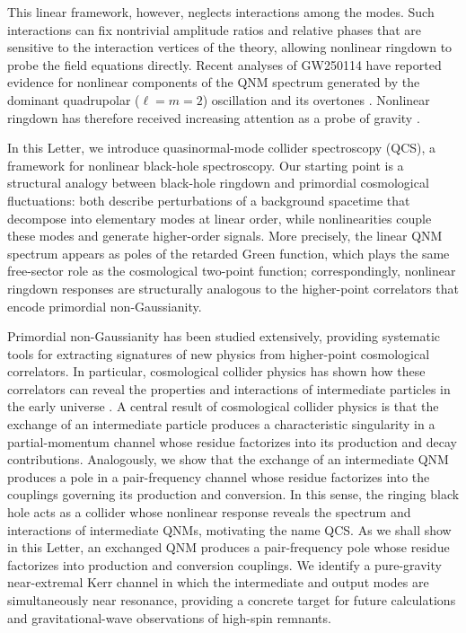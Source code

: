 \documentclass[
 reprint,
 amsmath,amssymb,
 aps,
 prl,
 superscriptaddress,
 nofootinbib
]{revtex4-2}
\begin{document}
This linear framework, however, neglects interactions among the modes. Such interactions can fix nontrivial amplitude ratios and relative phases that are sensitive to the interaction vertices of the theory, allowing nonlinear ringdown to probe the field equations directly. Recent analyses of GW250114
have reported evidence for nonlinear components of the QNM spectrum generated by the dominant quadrupolar ($\ell=m=2$) oscillation and its overtones \cite{LVKGW250114,YangShiHu2025,WangEtAl2026}. Nonlinear ringdown has therefore received increasing attention as a probe of gravity \cite{MitmanEtAl2023,CheungEtAl2024,BucciottiEtAl2024PRD,BucciottiEtAl2024JHEP,MaYang2024,KheraMaYang2025,BourgEtAl2025}.

In this Letter, we introduce quasinormal-mode collider spectroscopy (QCS), a framework for nonlinear black-hole spectroscopy. Our starting point is a structural analogy between black-hole ringdown and primordial cosmological fluctuations: both describe perturbations of a background spacetime that decompose into elementary modes at linear order, while nonlinearities couple these modes and generate higher-order signals. More precisely, the linear QNM spectrum appears as poles of the retarded Green function, which plays the same free-sector role as the cosmological two-point function; correspondingly, nonlinear ringdown responses are structurally analogous to the higher-point correlators that encode primordial non-Gaussianity.

Primordial non-Gaussianity has been studied extensively, providing systematic tools for extracting signatures of new physics from higher-point cosmological correlators. In particular, cosmological collider physics has shown how these correlators can reveal the properties and interactions of intermediate particles in the early universe  \cite{ArkaniHamedMaldacena2015,BaumannEtAl2021}. A central result of cosmological collider physics is that the exchange of an intermediate particle produces a characteristic singularity in a partial-momentum channel whose residue factorizes into its production and decay contributions. Analogously, we show that the exchange of an intermediate QNM produces a pole in a pair-frequency channel whose residue factorizes into the couplings governing its production and conversion. In this sense, the ringing black hole acts as a collider whose nonlinear response reveals the spectrum and interactions of intermediate QNMs, motivating the name QCS. As we shall show in this Letter, an exchanged QNM produces a pair-frequency pole whose residue factorizes into production and conversion couplings. We identify a pure-gravity near-extremal Kerr channel in which the intermediate and output modes are simultaneously near resonance, providing a concrete target for future calculations and gravitational-wave observations of high-spin remnants.
\end{document}
